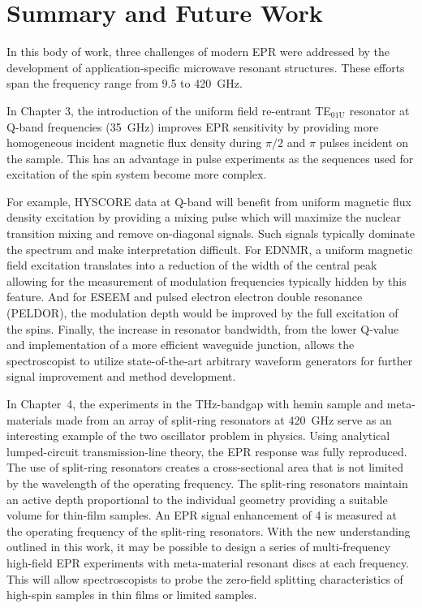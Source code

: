\chapter[Summary and Future Work]{Summary and Future Work}

In this body of work, three challenges of modern EPR were addressed by the development of application-specific microwave resonant structures. These efforts span the frequency range from 9.5 to 420~GHz.

In Chapter 3, the introduction of the uniform field re-entrant TE$_{\text{01U}}$ resonator at Q-band frequencies (35~GHz) improves EPR sensitivity by providing more homogeneous incident magnetic flux density during $\pi/2$ and $\pi$ pulses incident on the sample. This has an advantage in pulse experiments as the sequences used for excitation of the spin system become more complex. 

For example, HYSCORE data at Q-band will benefit from uniform magnetic flux density excitation by providing a mixing pulse which will maximize the nuclear transition mixing and remove on-diagonal signals. \cite{Doorslaer2007,Harmer2009} Such signals typically dominate the spectrum and make interpretation difficult. For EDNMR, a uniform magnetic field excitation translates into a reduction of the width of the central peak allowing for the measurement of modulation frequencies typically hidden by this feature. \cite{NicholasCox2013} And for ESEEM and pulsed electron electron double resonance (PELDOR), the modulation depth would be improved by the full excitation of the spins. Finally, the increase in resonator bandwidth, from the lower Q-value and implementation of a more efficient waveguide junction, allows the spectroscopist to utilize state-of-the-art arbitrary waveform generators for further signal improvement and method development. \cite{DOLL201327,dSegawa2015,SPINDLER201730,WILI201826,PRISNER201998}

In Chapter~4, the experiments in the THz-bandgap with hemin sample and meta-materials made from an array of split-ring resonators at 420~GHz serve as an interesting example of the two oscillator problem in physics. Using analytical lumped-circuit transmission-line theory, the EPR response was fully reproduced. The use of split-ring resonators creates a cross-sectional area that is not limited by the wavelength of the operating frequency. The split-ring resonators maintain an active depth proportional to the individual geometry providing a suitable volume for thin-film samples. An EPR signal enhancement of 4 is measured at the operating frequency of the split-ring resonators. With the new understanding outlined in this work, it may be possible to design a series of multi-frequency high-field EPR experiments with meta-material resonant discs at each frequency. This will allow spectroscopists to probe the zero-field splitting characteristics of high-spin samples in thin films or limited samples.

